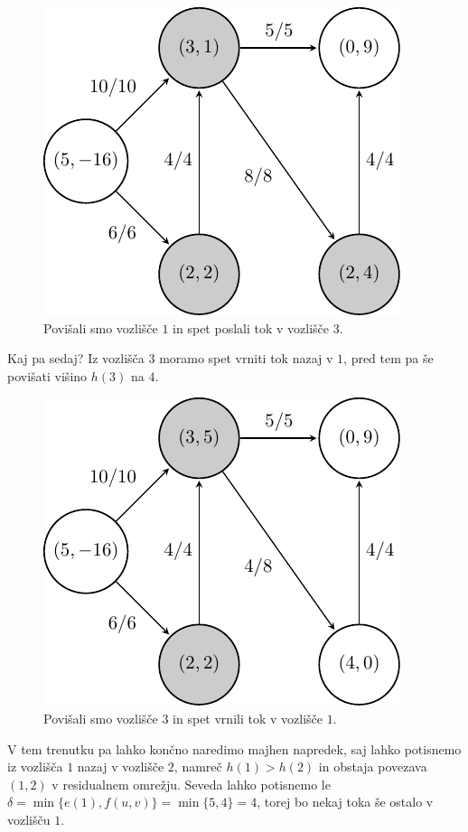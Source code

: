 \documentclass[mat1]{fmfdelo}
\begin{document}
\begin{figure}[H]
  \centering
  \includegraphics{images/graf2-8.pdf}
  \caption{Povišali smo vozlišče $1$ in spet poslali tok v vozlišče $3$.}
  \label{fig:slika8}
\end{figure}

Kaj pa sedaj? Iz vozlišča $3$ moramo spet vrniti tok nazaj v $1$, pred tem pa še povišati višino $h(3)$ na $4$.

\begin{figure}[H]
  \centering
  \includegraphics{images/graf2-9.pdf}
  \caption{Povišali smo vozlišče $3$ in spet vrnili tok v vozlišče $1$.}
  \label{fig:slika9}
\end{figure}

V tem trenutku pa lahko končno naredimo majhen napredek, saj lahko potisnemo iz vozlišča $1$ nazaj v vozlišče $2$, namreč $h(1) > h(2)$ in obstaja povezava $(1,2)$ v residualnem
omrežju. Seveda lahko potisnemo le $\delta = \min\{e(1), f(u,v)\} = \min\{5,4\} = 4$, torej bo nekaj toka še ostalo v vozlišču $1$.
\end{document}
